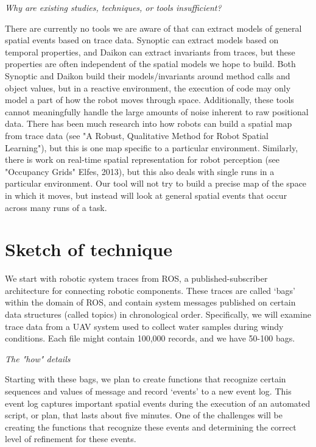 \documentclass{article}
\begin{document}
\emph{Why are existing studies, techniques, or tools insufficient?}

There are currently no tools we are aware of that can extract models of general spatial events based on trace data. 
Synoptic can extract models based on temporal properties, and Daikon can extract invariants from traces, but these properties are often independent of the spatial models we hope to build.
Both Synoptic and Daikon build their models/invariants around method calls and object values, but in a reactive environment, the execution of code may only model a part of how the robot moves through space.
Additionally, these tools cannot meaningfully handle the large amounts of noise inherent to raw positional data.
There has been much research into how robots can build a spatial map from trace data (see "A Robust, Qualitative Method for Robot Spatial Learning"), but this is one map specific to a particular environment.
Similarly, there is work on real-time spatial representation for robot perception (see "Occupancy Grids" Elfes, 2013), but this also deals with single runs in a particular environment.
Our tool will not try to build a precise map of the space in which it moves, but instead will look at general spatial events that occur across many runs of a task.

\section{Sketch of technique}

We start with robotic system traces from ROS, a published-subscriber architecture for connecting robotic components.  
These traces are called `bags' within the domain of ROS, and contain system messages published on certain data structures (called topics) in chronological order.
Specifically, we will examine trace data from a UAV system used to collect water samples during windy conditions.
Each file might contain 100,000 records, and we have 50-100 bags.

\emph{The "how" details}

Starting with these bags, we plan to create functions that recognize certain sequences and values of message and record `events' to a new event log.
This event log captures important spatial events during the execution of an automated script, or plan, that lasts about five minutes.
One of the challenges will be creating the functions that recognize these events and determining the correct level of refinement for these events.
\end{document}
